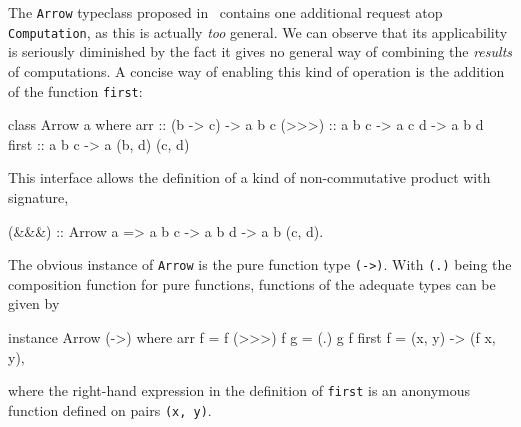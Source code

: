 The \verb|Arrow| typeclass proposed in~\cite{hughes-monad2arr} contains one
additional request atop \linebreak\verb|Computation|, as this is actually
\emph{too} general. We can observe that its applicability is seriously
diminished by the fact it gives no general way of combining the \emph{results}
of computations. A concise way of enabling this kind of operation is the
addition of the function \verb|first|:

\begin{code}
  class Arrow a where
      arr   :: (b -> c) -> a b c
      (>>>) :: a b c -> a c d -> a b d
      first :: a b c -> a (b, d) (c, d)
\end{code}

This interface allows the definition of a kind of non-commutative product with
signature,

\begin{code}
  (&&&) :: Arrow a => a b c -> a b d -> a b (c, d)\textrm{.}
\end{code}

The obvious instance of \verb|Arrow| is the pure function type \verb|(->)|. With
\verb|(.)| being the composition function for pure functions, functions of the
adequate types can be given by

\begin{code}
  instance Arrow (->) where
      arr f     = f
      (>>>) f g = (.) g f
      first f   = (x, y) -> (f x, y)\textrm{,}
\end{code}

where the right-hand expression in the definition of \verb|first| is an
anonymous function defined on pairs \verb|(x, y)|.

